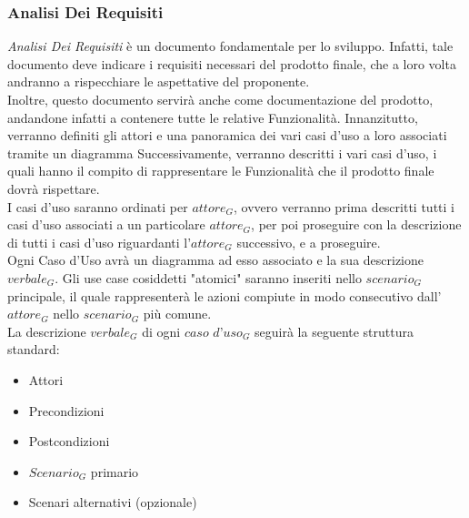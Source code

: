 \subsubsection{Analisi Dei Requisiti}
\textit{Analisi Dei Requisiti} è un documento fondamentale per lo sviluppo. Infatti, tale documento deve indicare i requisiti necessari del prodotto finale, che a loro volta andranno a rispecchiare le aspettative del proponente. \\
Inoltre, questo documento servirà anche come documentazione del prodotto, andandone infatti a contenere tutte le relative Funzionalità.
Innanzitutto, verranno definiti gli attori e una panoramica dei vari casi d'uso a loro associati tramite un diagramma
Successivamente, verranno descritti i vari casi d'uso, i quali hanno il compito di rappresentare le Funzionalità che il prodotto finale dovrà rispettare. \\
I casi d'uso saranno ordinati per $\textit{attore}_G$, ovvero verranno prima descritti tutti i casi d'uso associati a un particolare $\textit{attore}_G$, per poi proseguire con la descrizione di tutti i casi d'uso riguardanti l'$\textit{attore}_G$ successivo, e a proseguire. \\
Ogni Caso d'Uso avrà un diagramma ad esso associato e la sua descrizione $\textit{verbale}_G$. Gli use case cosiddetti "atomici" saranno inseriti nello $\textit{scenario}_G$ principale, il quale rappresenterà le azioni compiute in modo consecutivo dall'$\textit{attore}_G$ nello $\textit{scenario}_G$ più comune. \\
La descrizione $\textit{verbale}_G$ di ogni $\textit{caso d'uso}_G$ seguirà la seguente struttura standard:
\begin{itemize}
    \item Attori
    \item Precondizioni
    \item Postcondizioni
    \item $\textit{Scenario}_G$ primario
    \item Scenari alternativi (opzionale)
\end{itemize}


